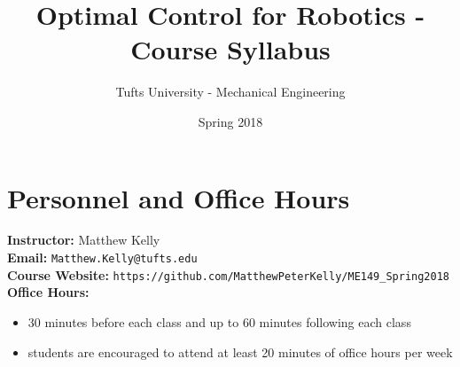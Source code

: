 \documentclass[onecolumn]{article}
\title{Optimal Control for Robotics - Course Syllabus}
\date{Spring 2018}
\author{Tufts University - Mechanical Engineering}
\begin{document}
\maketitle

\section*{Personnel and Office Hours}

\textbf{Instructor: }  Matthew Kelly \\
\textbf{Email: }  \texttt{Matthew.Kelly@tufts.edu}\\
\textbf{Course Website: }  \texttt{https://github.com/MatthewPeterKelly/ME149\_Spring2018} \\
\textbf{Office Hours: }
\vspace{-0.6em} \begin{itemize}  \setlength\itemsep{-0.4em}
  \item 30 minutes before each class and up to 60 minutes following each class
  \item students are encouraged to attend at least 20 minutes of office hours per week
\end{itemize}
\end{document}
